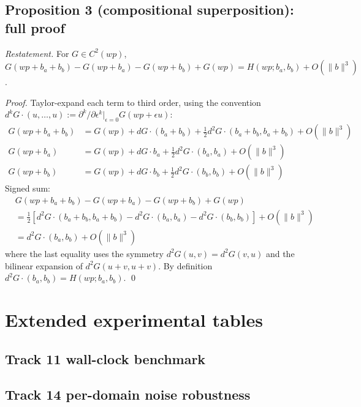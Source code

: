 \subsection{Proposition 3 (compositional superposition): full proof}

\noindent\emph{Restatement.} For $G\in C^2(wp)$,
$G(wp + b_a + b_b) - G(wp + b_a) - G(wp + b_b) + G(wp) =
 H(wp; b_a, b_b) + O(\|b\|^3)$.

\begin{proof}
Taylor-expand each term to third order, using the convention
$d^k G \cdot (u, \ldots, u) := \partial^k/\partial\epsilon^k|_{\epsilon=0}
 G(wp + \epsilon u)$:
\begin{align*}
G(wp + b_a + b_b) &= G(wp) + dG\cdot(b_a + b_b)
  + \tfrac12 d^2 G\cdot(b_a+b_b, b_a+b_b) + O(\|b\|^3)\\
G(wp + b_a) &= G(wp) + dG\cdot b_a + \tfrac12 d^2 G\cdot(b_a, b_a) + O(\|b\|^3)\\
G(wp + b_b) &= G(wp) + dG\cdot b_b + \tfrac12 d^2 G\cdot(b_b, b_b) + O(\|b\|^3)
\end{align*}
Signed sum:
\begin{align*}
&G(wp + b_a + b_b) - G(wp + b_a) - G(wp + b_b) + G(wp)\\
&= \tfrac12\!\left[d^2 G\cdot(b_a+b_b, b_a+b_b)
   - d^2 G\cdot(b_a, b_a) - d^2 G\cdot(b_b, b_b)\right] + O(\|b\|^3)\\
&= d^2 G\cdot(b_a, b_b) + O(\|b\|^3)
\end{align*}
where the last equality uses the symmetry $d^2 G(u,v) = d^2 G(v,u)$
and the bilinear expansion of $d^2 G(u+v, u+v)$.
By definition $d^2 G\cdot(b_a, b_b) = H(wp; b_a, b_b)$.
\qed
\end{proof}

\section{Extended experimental tables}
\label{app:tables}

\subsection{Track 11 wall-clock benchmark}


\subsection{Track 14 per-domain noise robustness}

